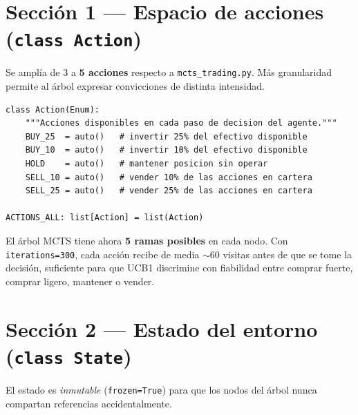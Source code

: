 \documentclass[12pt, a4paper]{article}
\begin{document}
\section{Sección 1 --- Espacio de acciones (\texttt{class Action})}

Se amplía de 3 a \textbf{5 acciones} respecto a \texttt{mcts\_trading.py}.
Más granularidad permite al árbol expresar convicciones de distinta intensidad.

\begin{lstlisting}[caption={Definicion del espacio de acciones}]
class Action(Enum):
    """Acciones disponibles en cada paso de decision del agente."""
    BUY_25  = auto()   # invertir 25% del efectivo disponible
    BUY_10  = auto()   # invertir 10% del efectivo disponible
    HOLD    = auto()   # mantener posicion sin operar
    SELL_10 = auto()   # vender 10% de las acciones en cartera
    SELL_25 = auto()   # vender 25% de las acciones en cartera

ACTIONS_ALL: list[Action] = list(Action)
\end{lstlisting}

\begin{tcolorbox}[clave]
  El árbol MCTS tiene ahora \textbf{5 ramas posibles} en cada nodo. Con
  \texttt{iterations=300}, cada acción recibe de media $\sim$60 visitas antes
  de que se tome la decisión, suficiente para que UCB1 discrimine con fiabilidad
  entre comprar fuerte, comprar ligero, mantener o vender.
\end{tcolorbox}

\section{Sección 2 --- Estado del entorno (\texttt{class State})}

El estado es \emph{inmutable} (\texttt{frozen=True}) para que los nodos del
árbol nunca compartan referencias accidentalmente.
\end{document}
